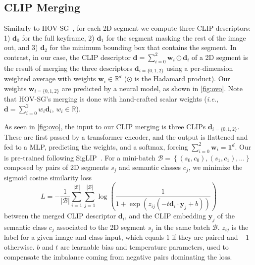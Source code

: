 \subsection{CLIP Merging}
\label{sec:merging}
Similarly to HOV-SG~\cite{hovsg}, for each 2D segment we compute three CLIP descriptors: 1) $\mathbf{d}_0$ for the full keyframe, 2) $\mathbf{d}_1$ for the segment masking the rest of the image out, and 3) $\mathbf{d}_2$ for the minimum bounding box that contains the segment.
In contrast, in our case, the CLIP descriptor $\mathbf{d}= \sum_{i=0}^2 \mathbf{w}_i \odot \mathbf{d}_i$ of a 2D segment is the result of merging the three descriptors $\mathbf{d}_{i=\{0, 1, 2\}}$ using a per-dimension weighted average with weights $\mathbf{w}_i \in \mathbb{R}^d$ ($\odot$ is the Hadamard product). Our weights $\mathbf{w}_{i=\{0, 1, 2\}}$ are predicted by a neural model, as shown in \cref{fig:ovo}. Note that HOV-SG's merging is done with hand-crafted scalar weights (\emph{i.e.}, $\mathbf{d}= \sum_{i=0}^2 {w}_i \mathbf{d}_i$, ${w}_i \in \mathbb{R}$).%

As seen in 
\cref{fig:ovo}, the input to our CLIP merging  is three CLIPs $\mathbf{d}_{i=\{0, 1, 2\}}$. 
These are first passed by a transformer encoder, and the output is flattened and fed to a MLP, predicting the weights, and a softmax, forcing $\sum_{i=0}^2 \mathbf{w}_{i}=\mathbf{1}^d$.
Our \clipours is pre-trained following  SigLIP~\cite{zhai2023siglip}.
For a mini-batch \(\mathcal{B} = \left\{ (s_0, c_0), (s_1, c_1), \dots \right\}\) composed by pairs of 2D segments $s_j$ and semantic classes $c_j$, we minimize the sigmoid cosine similarity loss
%
\begin{equation}
   L = -\frac{1}{|\mathcal{B}|} \sum_{i=1}^{|\mathcal{B}|} \sum_{j=1}^{|\mathcal{B}|} \log\! \left( \frac{1}{1 \! +\! \exp(z_{ij}(-t \mathbf{d}_i \cdot \mathbf{y}_j + b))} \right)
\end{equation} 
%
between the merged CLIP descriptor \(\mathbf{d}_i\), and the CLIP embedding \(\mathbf{y}_j\) of the semantic class $c_j$ associated to the 2D segment $s_j$ in the same batch $\mathcal{B}$. \(z_{ij}\) is the label for a given image and class input, which equals \(1\) if they are paired and \(-1\) otherwise. \(b\) and \(t\) are learnable bias and temperature parameters, used to compensate the imbalance coming from negative pairs dominating the loss.
%